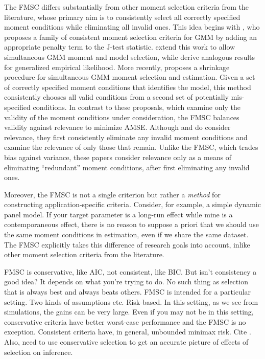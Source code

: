 The FMSC differs substantially from other moment selection criteria from the literature, whose primary aim is to consistently select all correctly specified moment conditions while eliminating all invalid ones.
This idea begins with \cite{Andrews1999}, who proposes a family of consistent moment selection criteria for GMM by adding an appropriate penalty term to the J-test statistic. 
\cite{AndrewsLu} extend this work to allow simultaneous GMM moment and model selection, while \cite{HongPrestonShum} derive analogous results for generalized empirical likelihood. 
More recently, \cite{Liao} proposes a shrinkage procedure for simultaneous GMM moment selection and estimation. 
Given a set of correctly specified moment conditions that identifies the model, this method consistently chooses all valid conditions from a second set of potentially mis-specified conditions.
In contrast to these proposals, which examine only the validity of the moment conditions under consideration, the FMSC balances validity against relevance to minimize AMSE.
Although \cite{HallPeixe2003} and \cite{ChengLiao} do consider relevance, they first consistently eliminate any invalid moment conditions and examine the relevance of only those that remain.
Unlike the FMSC, which trades bias against variance, these papers consider relevance only as a means of eliminating ``redundant'' moment conditions, after first eliminating any invalid ones.



Moreover, the FMSC is not a single criterion but rather a \emph{method} for constructing application-specific criteria.
Consider, for example, a simple dynamic panel model. If your target parameter is a long-run effect while mine is a contemporaneous effect, there is no reason to suppose a priori that we should use the same moment conditions in estimation, even if we share the same dataset.
The FMSC explicitly takes this difference of research goals into account, inlike other moment selection criteria from the literature.

FMSC is conservative, like AIC, not consistent, like BIC. 
But isn't consistency a good idea? 
It depends on what you're trying to do.
No such thing as selection that is always best and always beats others.
FMSC is intended for a particular setting.
Two kinds of assumptions etc.
Risk-based.
In this setting, as we see from simulations, the gains can be very large.
Even if you may not be in this setting, conservative criteria have better worst-case performance and the FMSC is no exception.
Consistent criteria have, in general, unbounded minimax risk.
Cite \cite{LeebPoetscher2008}.
Also, need to use conservative selection to get an accurate picture of effects of selection on inference.

